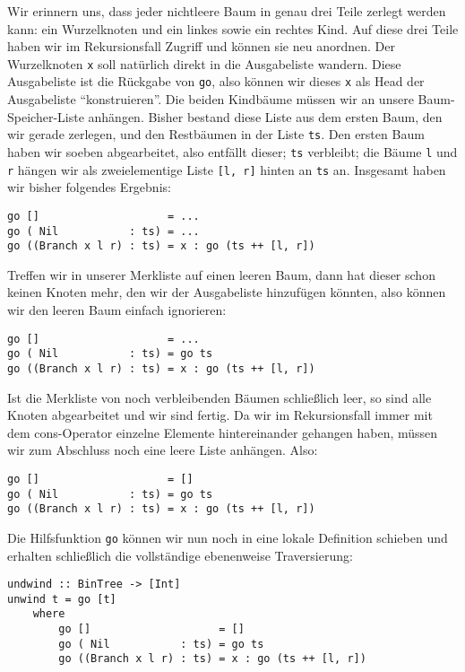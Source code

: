 \documentclass[ngerman, a4paper, 11pt]{article}
\theoremstyle{nonumberplain}
\begin{document}
Wir erinnern uns, dass jeder nichtleere Baum in genau drei Teile zerlegt werden kann: ein Wurzelknoten und ein linkes sowie ein rechtes Kind. Auf diese drei Teile haben wir im Rekursionsfall Zugriff und können sie neu anordnen. Der Wurzelknoten \texttt{x} soll natürlich direkt in die Ausgabeliste wandern. Diese Ausgabeliste ist die Rückgabe von \texttt{go}, also können wir dieses \texttt{x} als Head der Ausgabeliste \enquote{konstruieren}. Die beiden Kindbäume müssen wir an unsere Baum-Speicher-Liste anhängen. Bisher bestand diese Liste aus dem ersten Baum, den wir gerade zerlegen, und den Restbäumen in der Liste \texttt{ts}. Den ersten Baum haben wir soeben abgearbeitet, also entfällt dieser; \texttt{ts} verbleibt; die Bäume \texttt{l} und \texttt{r} hängen wir als zweielementige Liste \texttt{[l, r]} hinten an \texttt{ts} an. Insgesamt haben wir bisher folgendes Ergebnis:
\begin{lstlisting}[style=noframe]
go []                    = ...
go ( Nil           : ts) = ...
go ((Branch x l r) : ts) = x : go (ts ++ [l, r])
\end{lstlisting}
Treffen wir in unserer Merkliste auf einen leeren Baum, dann hat dieser schon keinen Knoten mehr, den wir der Ausgabeliste hinzufügen könnten, also können wir den leeren Baum einfach ignorieren:
\begin{lstlisting}[style=noframe]
go []                    = ...
go ( Nil           : ts) = go ts
go ((Branch x l r) : ts) = x : go (ts ++ [l, r])
\end{lstlisting}
Ist die Merkliste von noch verbleibenden Bäumen schließlich leer, so sind alle Knoten abgearbeitet und wir sind fertig. Da wir im Rekursionsfall immer mit dem cons-Operator einzelne Elemente hintereinander gehangen haben, müssen wir zum Abschluss noch eine leere Liste anhängen. Also:
\begin{lstlisting}[style=noframe]
go []                    = []
go ( Nil           : ts) = go ts
go ((Branch x l r) : ts) = x : go (ts ++ [l, r])
\end{lstlisting}
Die Hilfsfunktion \texttt{go} können wir nun noch in eine lokale Definition schieben und erhalten schließlich die vollständige ebenenweise Traversierung:
\begin{lstlisting}[style=frame]
undwind :: BinTree -> [Int]
unwind t = go [t]
	where
		go []                    = []
		go ( Nil           : ts) = go ts
		go ((Branch x l r) : ts) = x : go (ts ++ [l, r])
\end{lstlisting}
\end{document}
